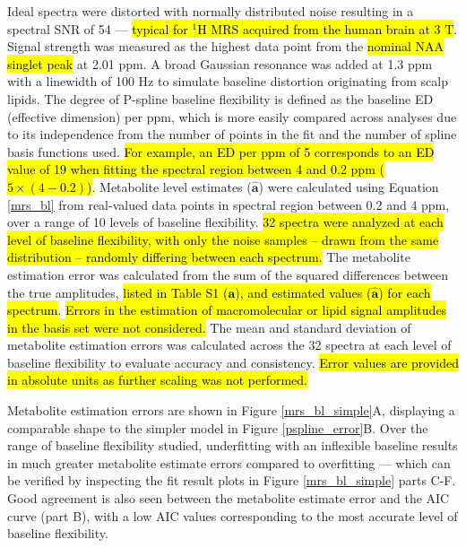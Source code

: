 \documentclass[num-refs]{wiley-article}
\newcommand{\revone}[2]{\hl{#1}\marginnote{\hl{#2}}}
\begin{document}
Ideal spectra were distorted with normally distributed noise resulting in a spectral SNR of 54 --- \revone{typical for $^1\mathrm{H}$ MRS acquired from the human brain at 3 T}{R2.6}. Signal strength was measured as the highest data point from the \revone{nominal NAA singlet peak}{R1.10} at 2.01 ppm. A broad Gaussian resonance was added at 1.3 ppm with a linewidth of 100 Hz to simulate baseline distortion originating from scalp lipids. The degree of P-spline baseline flexibility is defined as the baseline ED (effective dimension) per ppm, which is more easily compared across analyses due to its independence from the number of points in the fit and the number of spline basis functions used. \revone{For example, an ED per ppm of 5 corresponds to an ED value of 19 when fitting the spectral region between 4 and 0.2 ppm ($5 \times (4 - 0.2)$)}{R1.11}. Metabolite level estimates ($\hat{\mathbf{a}}$) were calculated using Equation \ref{mrs_bl} from real-valued data points in spectral region between 0.2 and 4 ppm, over a range of 10 levels of baseline flexibility. \revone{32 spectra were analyzed at each level of baseline flexibility, with only the noise samples -- drawn from the same distribution -- randomly differing between each spectrum.}{R2.8} The metabolite estimation error was calculated from the sum of the squared differences between the true amplitudes, \revone{listed in Table S1 ($\mathbf{a}$), and estimated values ($\hat{\mathbf{a}}$) for each spectrum}{R1.12,\linebreak R1.13,\linebreak R2.14}. \revone{Errors in the estimation of macromolecular or lipid signal amplitudes in the basis set were not considered.}{R2.14} The mean and standard deviation of metabolite estimation errors was calculated across the 32 spectra at each level of baseline flexibility to evaluate accuracy and consistency. \revone{Error values are provided in absolute units as further scaling was not performed.}{R1.13}

Metabolite estimation errors are shown in Figure \ref{mrs_bl_simple}A, displaying a comparable shape to the simpler model in Figure \ref{pspline_error}B. Over the range of baseline flexibility studied, underfitting with an inflexible baseline results in much greater metabolite estimate errors compared to overfitting --- which can be verified by inspecting the fit result plots in Figure \ref{mrs_bl_simple} parts C-F. Good agreement is also seen between the metabolite estimate error and the AIC curve (part B), with a low AIC values corresponding to the most accurate level of baseline flexibility.
\end{document}
